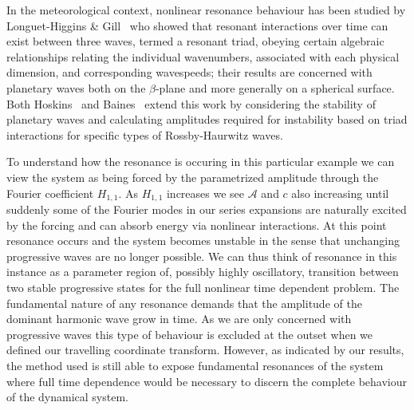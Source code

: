 In the meteorological context, nonlinear resonance behaviour has been studied by Longuet-Higgins \& Gill~\cite{Longuet:RIP} who showed that resonant interactions over time can exist between three waves, termed a resonant triad, obeying certain algebraic relationships relating the individual wavenumbers, associated with each physical dimension, and corresponding wavespeeds; their results are concerned with planetary waves both on the $\beta$-plane and more generally on a spherical surface. Both Hoskins~\cite{Hoskins:SRH} and Baines~\cite{Baines:SPW} extend this work by considering the stability of planetary waves and calculating amplitudes required for instability based on triad interactions for specific types of Rossby-Haurwitz waves.

To understand how the resonance is occuring in this particular example we can view the system as being forced by the parametrized amplitude through the Fourier coefficient $H_{1,1}$. As $H_{1,1}$ increases we see $\mathcal{A}$ and $c$ also increasing until suddenly some of the Fourier modes in our series expansions are naturally excited  by the forcing and can absorb energy via nonlinear interactions. At this point resonance occurs and the system becomes unstable in the sense that unchanging progressive waves are no longer possible. We can thus think of resonance in this instance as a parameter region of, possibly highly oscillatory, transition between two stable progressive states for the full nonlinear time dependent problem. The fundamental nature of any resonance demands that the amplitude of the dominant harmonic wave grow in time. As we are only concerned with progressive waves this type of behaviour is excluded at the outset when we defined our travelling coordinate transform. However, as indicated by our results, the method used is still able to expose fundamental resonances of the system where full time dependence would be necessary to discern the complete behaviour of the dynamical system.

